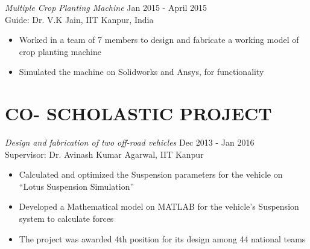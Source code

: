 \documentclass[margin, 10pt]{res} %
\begin{document}
\begin{resume}
{\sl Multiple Crop Planting Machine} \hfill Jan 2015 - April 2015 \\
Guide: Dr. V.K Jain, IIT Kanpur, India\\
\begin{itemize} %
\item Worked in a team of 7 members to design and fabricate a working model of crop planting machine
\item Simulated the machine on Solidworks and Ansys, for functionality 

\end{itemize}



\section{CO- SCHOLASTIC PROJECT} 
{\sl{Design and fabrication of two off-road vehicles}  } \hfill Dec 2013 - Jan 2016 \\
Supervisor: Dr. Avinash Kumar Agarwal, IIT Kanpur\\
\begin{itemize}
\item Calculated and optimized the Suspension parameters for the vehicle on “Lotus Suspension Simulation”
\item Developed a Mathematical model on MATLAB for the vehicle's Suspension system to calculate forces 
\item The project was awarded 4th position for its design among 44 national teams 
\end{itemize}







\end{resume}
\end{document}

